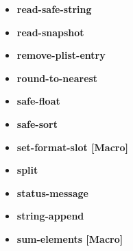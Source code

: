 \documentclass [11pt]{book}
\begin{document}
\begin{itemize}
\item {}
\label{prim:read-safe-string}
\textbf{read-safe-string}





\item {}
\label{prim:read-snapshot}
\textbf{read-snapshot}





\item {}
\label{prim:remove-plist-entry}
\textbf{remove-plist-entry}





\item {}
\label{prim:round-to-nearest}
\textbf{round-to-nearest}





\item {}
\label{prim:safe-float}
\textbf{safe-float}





\item {}
\label{prim:safe-sort}
\textbf{safe-sort}





\item {}
\label{prim:set-format-slot}
\textbf{set-format-slot [Macro]}





\item {}
\label{prim:split}
\textbf{split}





\item {}
\label{prim:status-message}
\textbf{status-message}





\item {}
\label{prim:string-append}
\textbf{string-append}





\item {}
\label{prim:sum-elements}
\textbf{sum-elements [Macro]}






\end{itemize}
\end{document}

